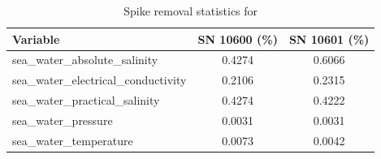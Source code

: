 \begin{table}[h]
\centering
\caption{Spike removal statistics for \projectname{} \casenumber{}}
\label{tab:str20_spike_stats}
\begin{tabular}{|l|c|c|}
\hline
Variable & SN 10600 (\%) & SN 10601 (\%) \\
\hline
sea\_water\_absolute\_salinity & 0.4274 & 0.6066 \\
sea\_water\_electrical\_conductivity & 0.2106 & 0.2315 \\
sea\_water\_practical\_salinity & 0.4274 & 0.4222 \\
sea\_water\_pressure & 0.0031 & 0.0031 \\
sea\_water\_temperature & 0.0073 & 0.0042 \\
\hline
\end{tabular}
\end{table}

